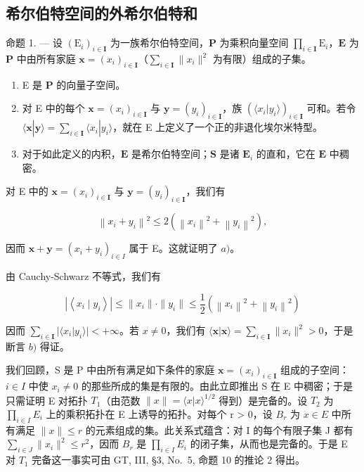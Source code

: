 \subsection{希尔伯特空间的外希尔伯特和}

命题 1. --- 设 \((\mathrm{E}_i)_{i\in \mathbf{I}}\) 为一族希尔伯特空间，\(\mathbf{P}\) 为乘积向量空间 \(\prod_{i\in \mathbf{I}}\mathrm{E}_i\)，\(\mathbf{E}\) 为 \(\mathbf{P}\) 中由所有家庭 \(\mathbf{x} = (x_i)_{i\in \mathbf{I}}\)（\(\sum_{i\in \mathbf{I}}\| x_i\|^2\) 为有限）组成的子集。

\begin{enumerate}
\def\labelenumi{\alph{enumi})}
\item
  E 是 \(\mathbf{P}\) 的向量子空间。
\item
  对 E 中的每个 \(\mathbf{x} = (x_i)_{i\in \mathbf{I}}\) 与 \(\mathbf{y} = (y_i)_{i\in \mathbf{I}}\)，族 \((\langle x_i|y_i\rangle)_{i\in \mathbf{I}}\) 可和。若令 \(\langle \mathbf{x}|\mathbf{y}\rangle = \sum_{i\in \mathbf{I}}\langle x_i|y_i\rangle\)，就在 E 上定义了一个正的非退化埃尔米特型。
\item
  对于如此定义的内积，\(\mathbf{E}\) 是希尔伯特空间；\(\mathbf{S}\) 是诸 \(\mathbf{E}_i\) 的直和，它在 \(\mathbf{E}\) 中稠密。
\end{enumerate}

对 E 中的 \(\mathbf{x} = (x_{i})_{i\in \mathbf{I}}\) 与 \(\mathbf{y} = (y_i)_{i\in \mathbf{I}}\)，我们有

\[
\left\| x _ {i} + y _ {i} \right\| ^ {2} \leqslant 2 \left(\left\| x _ {i} \right\| ^ {2} + \left\| y _ {i} \right\| ^ {2}\right),
\]

因而 \(\mathbf{x} + \mathbf{y} = (x_i + y_i)_{i\in I}\) 属于 E。这就证明了 \(a)\)。

由 Cauchy-Schwarz 不等式，我们有

\[
\left| \left\langle x _ {i} \mid y _ {i} \right\rangle \right| \leqslant \| x _ {i} \| \cdot \| y _ {i} \| \leqslant \frac {1}{2} \left(\left\| x _ {i} \right\| ^ {2} + \left\| y _ {i} \right\| ^ {2}\right)
\]

因而 \(\sum_{i\in \mathbf{I}}|\langle x_i|y_i\rangle | < +\infty\)。若 \(x\neq 0\)，我们有 \(\langle \mathbf{x}|\mathbf{x}\rangle = \sum_{i\in \mathbf{I}}\| x_i\|^2 >0\)，于是断言 \(b)\) 得证。

我们回顾，S 是 P 中由所有满足如下条件的家庭 \(\mathbf{x} = (x_{i})_{i \in \mathbf{I}}\) 组成的子空间：\(i \in I\) 中使 \(x_{i} \neq 0\) 的那些所成的集是有限的。由此立即推出 S 在 E 中稠密；于是只需证明 E 对拓扑 \(T_{1}\)（由范数 \(\|x\| = \langle x|x\rangle^{1/2}\) 得到）是完备的。设 \(T_{2}\) 为 \(\prod_{i \in I} E_{i}\) 上的乘积拓扑在 E 上诱导的拓扑。对每个 r \textgreater{} 0，设 \(B_{r}\) 为 \(x \in E\) 中所有满足 \(\|x\| \leqslant r\) 的元素组成的集。此关系式蕴含：对 I 的每个有限子集 J 都有 \(\sum_{i \in J} \|x_{i}\|^{2} \leqslant r^{2}\)，因而 \(B_{r}\) 是 \(\prod_{i \in I} E_{i}\) 的闭子集，从而也是完备的。于是 E 对 \(T_{1}\) 完备这一事实可由 GT, III, §3, No.~5, 命题 10 的推论 2 得出。

